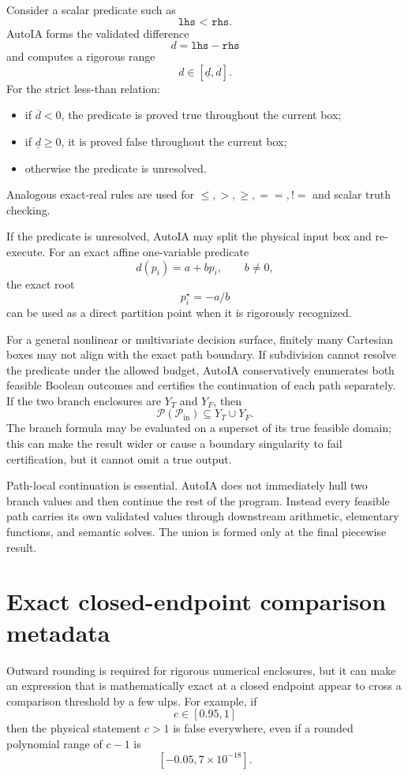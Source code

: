 \documentclass[11pt]{article}
\newcommand{\Pin}{\mathcal{P}_{\mathrm{in}}}
\begin{document}
Consider a scalar predicate such as
\[
  \texttt{lhs < rhs}.
\]
AutoIA forms the validated difference
\[
  d=\texttt{lhs}-\texttt{rhs}
\]
and computes a rigorous range
\[
  d\in[\underline d,\overline d].
\]
For the strict less-than relation:
\begin{itemize}[leftmargin=*]
\item if \(\overline d<0\), the predicate is proved true throughout the current
box;
\item if \(\underline d\ge0\), it is proved false throughout the current box;
\item otherwise the predicate is unresolved.
\end{itemize}
Analogous exact-real rules are used for \(\le,>,\ge,==,!=\) and scalar truth
checking.

If the predicate is unresolved, AutoIA may split the physical input box and
re-execute.  For an exact affine one-variable predicate
\[
  d(p_i)=a+bp_i,
  \qquad b\ne0,
\]
the exact root
\[
  p_i^\star=-a/b
\]
can be used as a direct partition point when it is rigorously recognized.

For a general nonlinear or multivariate decision surface, finitely many Cartesian
boxes may not align with the exact path boundary.  If subdivision cannot resolve
the predicate under the allowed budget, AutoIA conservatively enumerates both
feasible Boolean outcomes and certifies the continuation of each path separately.
If the two branch enclosures are \(Y_T\) and \(Y_F\), then
\[
  \mathcal{P}(\Pin)\subseteq Y_T\cup Y_F.
\]
The branch formula may be evaluated on a superset of its true feasible domain;
this can make the result wider or cause a boundary singularity to fail
certification, but it cannot omit a true output.

Path-local continuation is essential.  AutoIA does not immediately hull two
branch values and then continue the rest of the program.  Instead every feasible
path carries its own validated values through downstream arithmetic, elementary
functions, and semantic solves.  The union is formed only at the final piecewise
result.

\section{Exact closed-endpoint comparison metadata}

Outward rounding is required for rigorous numerical enclosures, but it can make
an expression that is mathematically exact at a closed endpoint appear to cross
a comparison threshold by a few ulps.  For example, if
\[
  c\in[0.95,1]
\]
then the physical statement \(c>1\) is false everywhere, even if a rounded
polynomial range of \(c-1\) is
\[
  [-0.05,7\times10^{-18}].
\]
\end{document}
